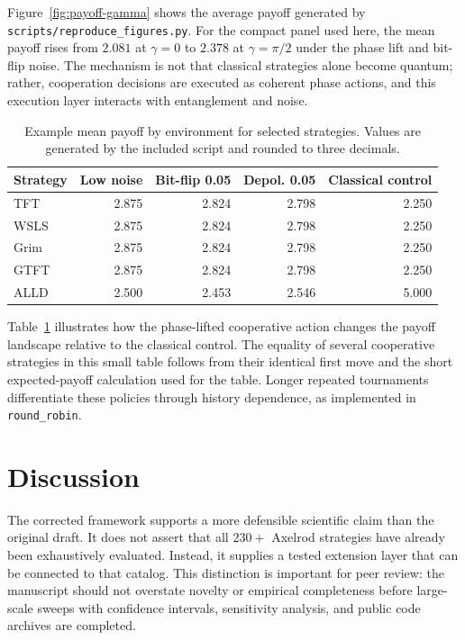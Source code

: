 \documentclass[11pt]{article}
\begin{document}
Figure~\ref{fig:payoff-gamma} shows the average payoff generated by \texttt{scripts/reproduce\_figures.py}. For the compact panel used here, the mean payoff rises from $2.081$ at $\gamma=0$ to $2.378$ at $\gamma=\pi/2$ under the phase lift and bit-flip noise. The mechanism is not that classical strategies alone become quantum; rather, cooperation decisions are executed as coherent phase actions, and this execution layer interacts with entanglement and noise.

\begin{table}[H]
\centering
\caption{Example mean payoff by environment for selected strategies. Values are generated by the included script and rounded to three decimals.}
\label{tab:env}
\begin{tabular}{lrrrr}
\toprule
Strategy & Low noise & Bit-flip 0.05 & Depol. 0.05 & Classical control\\
\midrule
TFT  & 2.875 & 2.824 & 2.798 & 2.250\\
WSLS & 2.875 & 2.824 & 2.798 & 2.250\\
Grim & 2.875 & 2.824 & 2.798 & 2.250\\
GTFT & 2.875 & 2.824 & 2.798 & 2.250\\
ALLD & 2.500 & 2.453 & 2.546 & 5.000\\
\bottomrule
\end{tabular}
\end{table}

Table~\ref{tab:env} illustrates how the phase-lifted cooperative action changes the payoff landscape relative to the classical control. The equality of several cooperative strategies in this small table follows from their identical first move and the short expected-payoff calculation used for the table. Longer repeated tournaments differentiate these policies through history dependence, as implemented in \texttt{round\_robin}.

\section{Discussion}
The corrected framework supports a more defensible scientific claim than the original draft. It does not assert that all $230+$ Axelrod strategies have already been exhaustively evaluated. Instead, it supplies a tested extension layer that can be connected to that catalog. This distinction is important for peer review: the manuscript should not overstate novelty or empirical completeness before large-scale sweeps with confidence intervals, sensitivity analysis, and public code archives are completed.
\end{document}
